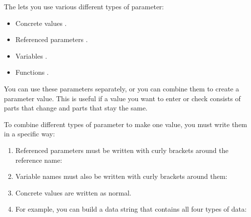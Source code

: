 
The \ite{} lets you use various different types of parameter:
\begin{itemize}
\item Concrete values .
\item Referenced parameters .
\item Variables .
\item Functions .
\end{itemize}

You can use these parameters separately, or you can combine them to create a parameter value. This is useful if a value you want to enter or check consists of parts that change and parts that stay the same. 

To combine different types of parameter to make one value, you must write them in a specific way:
\begin{enumerate}
\item Referenced parameters must be written with curly brackets around the reference name:\\
\item Variable names must also be written with curly brackets around them:\\
\item Concrete values are written as normal. 
\item For example, you can build a data string that contains all four types of data:\\
\\

\end{enumerate}

